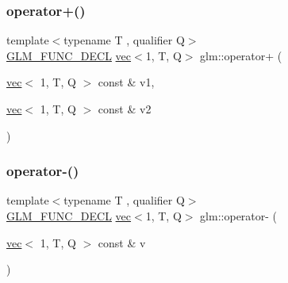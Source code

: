 \subsubsection{\texorpdfstring{operator+()}{operator+()}\hspace{0.1cm}{\footnotesize\ttfamily [4/4]}}
{\footnotesize\ttfamily template$<$typename T , qualifier Q$>$ \\
\mbox{\hyperlink{setup_8hpp_ab2d052de21a70539923e9bcbf6e83a51}{G\+L\+M\+\_\+\+F\+U\+N\+C\+\_\+\+D\+E\+CL}} \mbox{\hyperlink{structglm_1_1vec}{vec}}$<$1, T, Q$>$ glm\+::operator+ (\begin{DoxyParamCaption}\item[{\mbox{\hyperlink{structglm_1_1vec}{vec}}$<$ 1, T, Q $>$ const \&}]{v1,  }\item[{\mbox{\hyperlink{structglm_1_1vec}{vec}}$<$ 1, T, Q $>$ const \&}]{v2 }\end{DoxyParamCaption})}

\mbox{\label{group__ext__vec1_gad2032db9362999ab1c27aae09816c9fd}} 
\subsubsection{\texorpdfstring{operator-\/()}{operator-()}\hspace{0.1cm}{\footnotesize\ttfamily [1/4]}}
{\footnotesize\ttfamily template$<$typename T , qualifier Q$>$ \\
\mbox{\hyperlink{setup_8hpp_ab2d052de21a70539923e9bcbf6e83a51}{G\+L\+M\+\_\+\+F\+U\+N\+C\+\_\+\+D\+E\+CL}} \mbox{\hyperlink{structglm_1_1vec}{vec}}$<$1, T, Q$>$ glm\+::operator-\/ (\begin{DoxyParamCaption}\item[{\mbox{\hyperlink{structglm_1_1vec}{vec}}$<$ 1, T, Q $>$ const \&}]{v }\end{DoxyParamCaption})}

\mbox{\label{group__ext__vec1_ga8069f3e0f8b424bda71c65bdadaaf73c}} 
